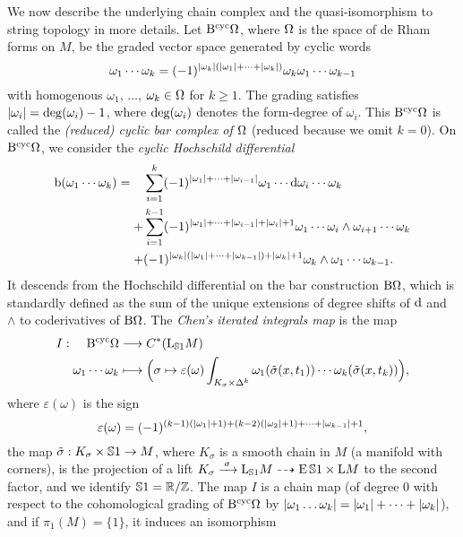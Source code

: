 \documentclass[\MainFolder/Text.tex]{subfiles}
\begin{document}
We now describe the underlying chain complex and the quasi-isomorphism to string topology in more details. Let $\mathrm{B}^{\mathrm{cyc}} \Omega$, where $\Omega$ is the space of de Rham forms on $M$, be the graded vector space generated by cyclic words 
$$ \omega_1\dotsb\omega_k = (-1)^{|\omega_k|(|\omega_1|+\dotsb+|\omega_k|)} \omega_k\omega_1 \dotsb \omega_{k-1} $$
with homogenous $\omega_1$, $\dotsc$, $\omega_k \in \Omega$ for $k\ge 1$. The grading satisfies $|\omega_i| = \operatorname{deg}(\omega_i) - 1$, where $\operatorname{deg}(\omega_i)$ denotes the form-degree of $\omega_i$. This $\mathrm{B}^{\mathrm{cyc}} \Omega$ is called the \emph{(reduced) cyclic bar complex of $\Omega$} (reduced because we omit $k=0$). On $\mathrm{B}^{\mathrm{cyc}} \Omega$, we consider the \emph{cyclic Hochschild differential}
$$ \mathrm{b}(\omega_1 \dotsb \omega_k) = \begin{aligned}[t]
&\sum_{i=1}^k (-1)^{|\omega_1| + \dotsb + |\omega_{i-1}|}\omega_1 \dotsb\mathrm{d}\omega_i\dotsb \omega_k \\
+&\sum_{i=1}^{k-1} (-1)^{|\omega_1|+\dotsb + |\omega_{i-1}| + |\omega_i| + 1}\omega_1 \dotsb \omega_i \wedge \omega_{i+1} \dotsb \omega_k\\
+&(-1)^{|\omega_k|(|\omega_1| + \dotsb + |\omega_{k-1}|) + |\omega_k| + 1}\omega_k \wedge \omega_1 \dotsb \omega_{k-1}.
\end{aligned}$$
It descends from the Hochschild differential on the bar construction $\mathrm{B} \Omega$, which is standardly defined as the sum of the unique extensions of degree shifts of $\mathrm{d}$ and $\wedge$ to coderivatives of $\mathrm{B} \Omega$. The \emph{Chen's iterated integrals map} is the map
$$ I: \begin{aligned}[t]
    \mathrm{B}^{\mathrm{cyc}} \Omega& \longrightarrow C^*(\mathrm{L}_{\mathbb{S}{1}} M)\\    
    \omega_1 \dotsb \omega_k & \longmapsto  \Bigl(\sigma \mapsto \varepsilon(\omega) \int_{K_\sigma \times \Delta^k} \omega_1(\tilde{\sigma}(x,t_1)) \dotsb \omega_k(\tilde{\sigma}(x,t_k))\Bigr),
   \end{aligned}$$
where $\varepsilon(\omega)$ is the sign
$$ \varepsilon(\omega) = (-1)^{(k-1)(|\omega_1| + 1) + (k-2)(|\omega_2| + 1) + \dotsb + |\omega_{k-1}| + 1}, $$
the map $\tilde{\sigma}: K_\sigma\times\mathbb{S}{1} \rightarrow M$, where $K_\sigma$ is a smooth chain in $M$ (a manifold with corners), is the projection of a lift $K_\sigma \xrightarrow{\hspace{.2em}\sigma\hspace{.2em}}\mathrm{L}_{\mathbb{S}{1}} M \dasharrow \operatorname{E} \mathbb{S}{1} \times \mathrm{L} M$ to the second factor, and we identify $\mathbb{S}{1} = \mathbb{R}/\mathbb{Z}$. The map $I$ is a chain map (of degree $0$ with respect to the cohomological grading of $\mathrm{B}^{\mathrm{cyc}}\Omega$ by $|\omega_1 \dotsc \omega_k| = |\omega_1| + \dotsb + |\omega_k|$), and if $\pi_1(M) = \{1\}$, it induces an isomorphism 
\end{document}
